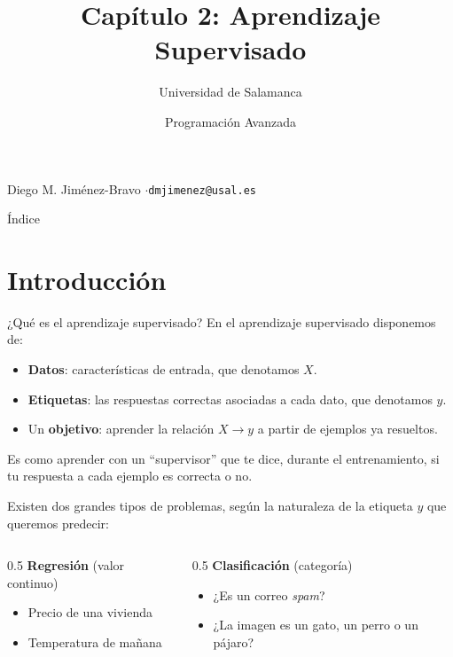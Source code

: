 \documentclass[aspectratio=169]{beamer}
\title[2. Aprendizaje Supervisado]{Capítulo 2: Aprendizaje\\Supervisado}
\author{Universidad de Salamanca}
\institute{Facultad de Ciencias}
\date{Programación Avanzada}
\makeatletter
\newcommand{\titleslide}{%
\begin{frame}
  \titlepage
  \vspace{-0.5em}
  {\footnotesize Diego M. Jiménez-Bravo \quad$\cdot$\quad \texttt{dmjimenez@usal.es}}
\end{frame}
}
\makeatother
\begin{document}
\titleslide

\begin{frame}{Índice}
  \tableofcontents
\end{frame}

\section{Introducción}

\begin{frame}{¿Qué es el aprendizaje supervisado?}
  En el aprendizaje supervisado disponemos de:
  \begin{itemize}
    \item \textbf{Datos}: características de entrada, que denotamos $X$.
    \item \textbf{Etiquetas}: las respuestas correctas asociadas a cada dato, que denotamos $y$.
    \item Un \textbf{objetivo}: aprender la relación $X \rightarrow y$ a partir de ejemplos ya resueltos.
  \end{itemize}
  Es como aprender con un ``supervisor'' que te dice, durante el entrenamiento, si tu respuesta a cada ejemplo es correcta o no.

  Existen dos grandes tipos de problemas, según la naturaleza de la etiqueta $y$ que queremos predecir:
  \begin{columns}
    \begin{column}{0.5\textwidth}
      \textbf{Regresión} (valor continuo)
      \begin{itemize}
        \small
        \item Precio de una vivienda
        \item Temperatura de mañana
      \end{itemize}
    \end{column}
    \begin{column}{0.5\textwidth}
      \textbf{Clasificación} (categoría)
      \begin{itemize}
        \small
        \item ¿Es un correo \textit{spam}?
        \item ¿La imagen es un gato, un perro o un pájaro?
      \end{itemize}
    \end{column}
  \end{columns}
\end{frame}

\end{document}
